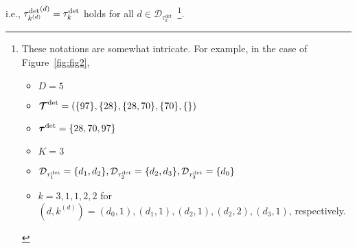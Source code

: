 i.e., ${\tau_{k^{(d)}}^{\text{det}}}^{\hspace{-0.7mm}(d)} = \tau_k^{\text{det}}$ holds for all $d \in \mathcal{D}_{\tau_k^{\text{det}}}$~\footnote{
  These notations are somewhat intricate. For example, in the case of Figure~\ref{fig:fig2}, 
  \begin{itemize}  
   \item $D=5$  
   \item $\bm{\mathcal{T}}^{\rm det} = \left(\{97\}, \{28\}, \{28, 70\}, \{70\}, \{\}\right)$  
   \item $\bm{\tau}^{\rm det} = \{28, 70, 97\}$  
   \item $K=3$  
   \item $\mathcal{D}_{\tau_1^{\rm det}} = \{d_1, d_2\}, \mathcal{D}_{\tau_2^{\rm det}} = \{d_2, d_3\}, \mathcal{D}_{\tau_3^{\rm det}} = \{d_0\}$  
   \item $k = 3, 1, 1, 2, 2$ for $(d, k^{(d)}) = (d_0, 1), (d_1, 1), (d_2, 1), (d_2, 2), (d_3, 1)$, respectively.
  \end{itemize}  
  }.

